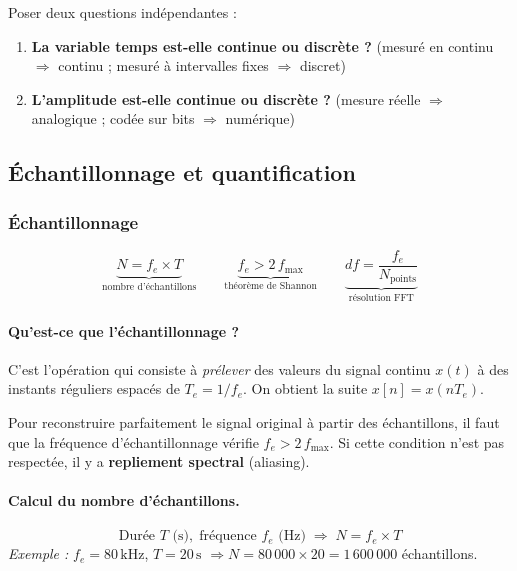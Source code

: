 \documentclass[12pt,a4paper]{article}
\begin{document}
\begin{tcolorbox}[methbox, title=Méthode -- Identifier le type d'un signal]
Poser deux questions indépendantes :
\begin{enumerate}
  \item \textbf{La variable temps est-elle continue ou discrète ?}
        (mesuré en continu $\Rightarrow$ continu ; mesuré à intervalles fixes $\Rightarrow$ discret)
  \item \textbf{L'amplitude est-elle continue ou discrète ?}
        (mesure réelle $\Rightarrow$ analogique ; codée sur bits $\Rightarrow$ numérique)
\end{enumerate}
\end{tcolorbox}

\subsection{Échantillonnage et quantification}

\subsubsection{Échantillonnage}

\begin{tcolorbox}[formbox, title=Formules clés -- Échantillonnage]
\[
  \underbrace{N = f_e \times T}_{\text{nombre d'échantillons}}
  \qquad
  \underbrace{f_e > 2\,f_{\max}}_{\text{théorème de Shannon}}
  \qquad
  \underbrace{df = \frac{f_e}{N_{\text{points}}}}_{\text{résolution FFT}}
\]
\end{tcolorbox}

\paragraph{Qu'est-ce que l'échantillonnage ?}
C'est l'opération qui consiste à \textit{prélever} des valeurs du signal continu $x(t)$
à des instants réguliers espacés de $T_e = 1/f_e$.
On obtient la suite $x[n] = x(nT_e)$.

\begin{tcolorbox}[alertbox, title=Attention -- Théorème de Shannon (Nyquist)]
Pour reconstruire parfaitement le signal original à partir des échantillons,
il faut que la fréquence d'échantillonnage vérifie $f_e > 2\,f_{\max}$.
Si cette condition n'est pas respectée, il y a \textbf{repliement spectral} (aliasing).
\end{tcolorbox}

\paragraph{Calcul du nombre d'échantillons.}
\[
  \text{Durée } T \text{ (s)},\; \text{fréquence } f_e \text{ (Hz)}
  \;\Longrightarrow\;
  N = f_e \times T
\]
\textit{Exemple :} $f_e = 80\,\text{kHz}$, $T = 20\,\text{s}$
$\Rightarrow N = 80\,000 \times 20 = 1\,600\,000$ échantillons.
\end{document}
